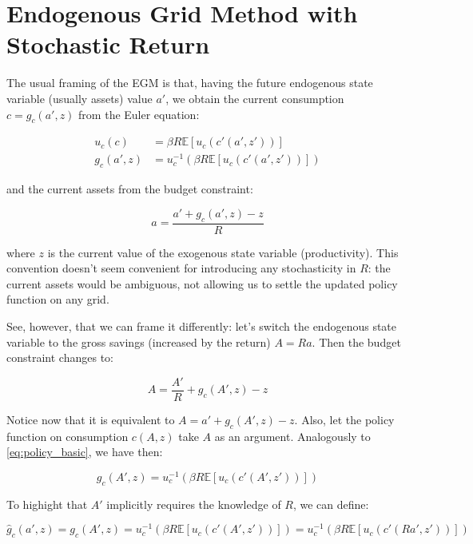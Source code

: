 \documentclass[12pt]{article}
\begin{document}
\section{Endogenous Grid Method with Stochastic Return}
\label{app:egm_stoch}

The usual framing of the EGM is that, having the future endogenous state variable (usually assets) value $a'$, we obtain the current consumption $c = g_c(a',z)$ from the Euler equation:

\begin{align}
    u_c(c) &= \beta R \mathbb{E}[u_c(c'(a',z'))] \\
    g_c(a',z)& = u_c^{-1} \left( \beta R \mathbb{E}[u_c(c'(a',z'))] \right) \label{eq:policy_basic}
\end{align}

and the current assets from the budget constraint:

\begin{equation}
    a = \frac{a' + g_c(a',z) - z}{R}
\end{equation}

where $z$ is the current value of the exogenous state variable (productivity). This convention doesn't seem convenient for introducing any stochasticity in $R$: the current assets would be ambiguous, not allowing us to settle the updated policy function on any grid.

See, however, that we can frame it differently: let's switch the endogenous state variable to the gross savings (increased by the return) $A = Ra$. Then the budget constraint changes to: 

\begin{equation}
    A = \frac{A'}{R} + g_c(A',z) - z
\end{equation}

Notice now that it is equivalent to $A = a' + g_c(A',z) - z$. Also, let the policy function on consumption $c(A,z)$ take $A$ as an argument. Analogously to \eqref{eq:policy_basic}, we have then:

\begin{equation}
    g_c(A',z) = u_c^{-1} \left( \beta R \mathbb{E}[u_c(c'(A',z'))] \right)
\end{equation}

To highight that $A'$ implicitly requires the knowledge of $R$, we can define:

\begin{equation}
    \hat{g}_c(a',z) = g_c(A',z) = u_c^{-1} \left( \beta R \mathbb{E}[u_c(c'(A',z'))] \right) = u_c^{-1} \left( \beta R \mathbb{E}[u_c(c'(R a',z'))] \right)
\end{equation}
\end{document}

